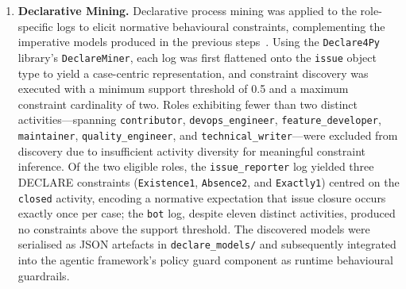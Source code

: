 \begin{enumerate}
    \item \textbf{Declarative Mining.}
    Declarative process mining was applied to the role-specific logs to elicit normative behavioural constraints, complementing the imperative models produced in the previous steps~\cite{notebook:09}.
    Using the \texttt{Declare4Py} library's \texttt{DeclareMiner}, each log was first flattened onto the \texttt{issue} object type to yield a case-centric representation, and constraint discovery was executed with a minimum support threshold of 0.5 and a maximum constraint cardinality of two.
    Roles exhibiting fewer than two distinct activities—spanning \texttt{contributor}, \texttt{devops\_engineer}, \texttt{feature\_developer}, \texttt{maintainer}, \texttt{quality\_engineer}, and \texttt{technical\_writer}—were excluded from discovery due to insufficient activity diversity for meaningful constraint inference.
    Of the two eligible roles, the \texttt{issue\_reporter} log yielded three DECLARE constraints (\texttt{Existence1}, \texttt{Absence2}, and \texttt{Exactly1}) centred on the \texttt{closed} activity, encoding a normative expectation that issue closure occurs exactly once per case; the \texttt{bot} log, despite eleven distinct activities, produced no constraints above the support threshold.
    The discovered models were serialised as JSON artefacts in \texttt{declare\_models/} and subsequently integrated into the agentic framework's policy guard component as runtime behavioural guardrails.

\end{enumerate}
